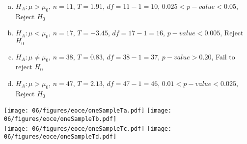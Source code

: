 {
\begin{enumerate}[(a)]
\setlength{\itemsep}{0mm}
\item $H_A: \mu > \mu_0 $, $n = 11$, $T= 1.91$, $df = 11 - 1 = 10$, $0.025 < p-value < 0.05$, Reject $H_0$
\item $H_A: \mu < \mu_0 $, $n = 17$, $T = -3.45$, $df = 17 - 1 = 16$, $p-value < 0.005$, Reject $H_0$
\item $H_A: \mu \ne \mu_0 $, $n = 38$, $T = 0.83$, $df = 38 - 1 = 37$, $p-value > 0.20$, Fail to reject $H_0$
\item $H_A: \mu > \mu_0 $, $n = 47$, $T = 2.13$, $df = 47 - 1 = 46$, $0.01 < p-value < 0.025$, Reject $H_0$ \\
\end{enumerate}

\begin{center}
\texttt{[image: 06/figures/eoce/oneSampleTa.pdf]}
\texttt{[image: 06/figures/eoce/oneSampleTb.pdf]} \\
\texttt{[image: 06/figures/eoce/oneSampleTc.pdf]}
\texttt{[image: 06/figures/eoce/oneSampleTd.pdf]}
\end{center}
}


